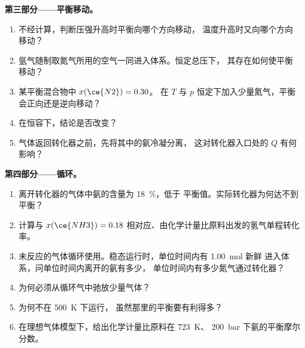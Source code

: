 \begin{problem}
\medskip
\noindent\textbf{第三部分——平衡移动。}
\begin{enumerate}[resume]
  \item 不经计算，判断压强升高时平衡向哪个方向移动，
        温度升高时又向哪个方向移动？
  \item 氩气随制取氮气所用的空气一同进入体系。恒定总压下，
        其存在如何使平衡移动？
  \item 某平衡混合物中 $x(\ce{N2}) = 0.30$。
        在 $T$ 与 $p$ 恒定下加入少量氮气，平衡会正向还是逆向移动？
  \item 在恒容下，结论是否改变？
  \item 气体返回转化器之前，先将其中的氨冷凝分离，
        这对转化器入口处的 $Q$ 有何影响？
\end{enumerate}

\medskip
\noindent\textbf{第四部分——循环。}
\begin{enumerate}[resume]
  \item 离开转化器的气体中氨的含量为 \qty{18}{\percent}，低于
        平衡值。实际转化器为何达不到
        平衡？
  \item 计算与
        $x(\ce{NH3}) = 0.18$ 相对应、由化学计量比原料出发的氢气单程转化率。
  \item 未反应的气体循环使用。稳态运行时，单位时间内有 \qty{1.00}{mol}
        新鲜  进入体系，问单位时间内离开的氨有多少，
        单位时间内有多少氮气通过转化器？
  \item 为何必须从循环气中驰放少量气体？
  \item 为何不在 \qty{500}{K} 下运行，
        虽然那里的平衡要有利得多？
  \item 在理想气体模型下，给出化学计量比原料在 \qty{723}{K}、
        \qty{200}{bar} 下氨的平衡摩尔分数。
\end{enumerate}
\end{problem}
